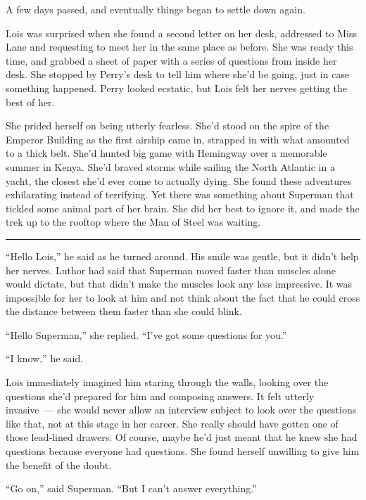 \documentclass[ebook,12pt]{memoir}
\begin{document}
A few days passed, and eventually things began to settle down again.

Lois was surprised when she found a second letter on her desk, addressed
to Miss Lane and requesting to meet her in the same place as before. She
was ready this time, and grabbed a sheet of paper with a series of
questions from inside her desk. She stopped by Perry's desk to tell him
where she'd be going, just in case something happened. Perry looked
ecstatic, but Lois felt her nerves getting the best of her.

She prided herself on being utterly fearless. She'd stood on the spire
of the Emperor Building as the first airship came in, strapped in with
what amounted to a thick belt. She'd hunted big game with Hemingway over
a memorable summer in Kenya. She'd braved storms while sailing the North
Atlantic in a yacht, the closest she'd ever come to actually dying. She
found these adventures exhilarating instead of terrifying. Yet there was
something about Superman that tickled some animal part of her brain. She
did her best to ignore it, and made the trek up to the rooftop where the
Man of Steel was waiting.

\begin{center}\rule{0.5\linewidth}{\linethickness}\end{center}

``Hello Lois,'' he said as he turned around. His smile was gentle, but
it didn't help her nerves. Luthor had said that Superman moved faster
than muscles alone would dictate, but that didn't make the muscles look
any less impressive. It was impossible for her to look at him and not
think about the fact that he could cross the distance between them
faster than she could blink.

``Hello Superman,'' she replied. ``I've got some questions for you.''

``I know,'' he said.

Lois immediately imagined him staring through the walls, looking over
the questions she'd prepared for him and composing answers. It felt
utterly invasive~--- she would never allow an interview subject to look
over the questions like that, not at this stage in her career. She
really should have gotten one of those lead‐lined drawers. Of course,
maybe he'd just meant that he knew she had questions because everyone
had questions. She found herself unwilling to give him the benefit of
the doubt.

``Go on,'' said Superman. ``But I can't answer everything.''
\end{document}
